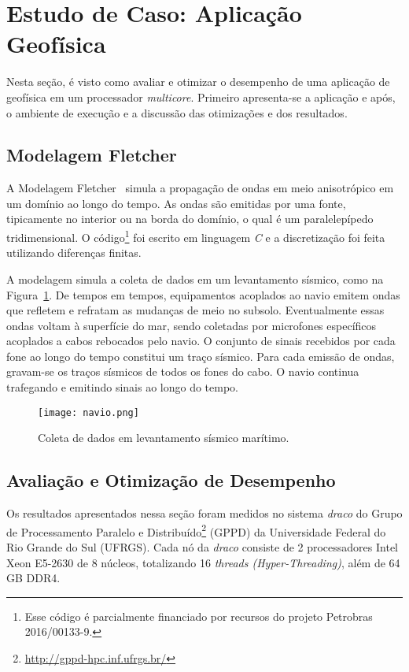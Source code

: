 \section{Estudo de Caso: Aplicação Geofísica}\label{sec:experiments}

Nesta seção, é visto como avaliar e otimizar o desempenho de uma aplicação de geofísica em um processador \textit{multicore}. Primeiro apresenta-se a aplicação e após, o ambiente de execução e a discussão das otimizações e dos resultados.

\subsection{Modelagem Fletcher}

A Modelagem Fletcher~\cite{fletcher2009reverse} simula a propagação de ondas em meio anisotrópico em um domínio ao longo do tempo. As ondas são emitidas por uma fonte, tipicamente no interior ou na borda do domínio, o qual é um paralelepípedo tridimensional. O código\footnote{Esse código é parcialmente financiado por recursos do projeto Petrobras 2016/00133-9.} foi escrito em linguagem \emph{C} e a discretização foi feita utilizando diferenças finitas.

A modelagem simula a coleta de dados em um levantamento sísmico, como na Figura~\ref{fig:sim}. De tempos em tempos, equipamentos acoplados ao navio emitem ondas que refletem e refratam as mudanças de meio no subsolo. Eventualmente essas ondas voltam à superfície do mar, sendo coletadas por microfones específicos acoplados a cabos rebocados pelo navio. O conjunto de sinais recebidos por cada fone ao longo do tempo constitui um traço sísmico. Para cada emissão de ondas, gravam-se os traços sísmicos de todos os fones do cabo. O navio continua trafegando e emitindo sinais ao longo do tempo.

\begin{figure}[!htb]
	\centerline{\texttt{[image: navio.png]}}
	\caption{Coleta de dados em levantamento sísmico marítimo.}
	\label{fig:sim}
\end{figure}

\subsection{Avaliação e Otimização de Desempenho}

Os resultados apresentados nessa seção foram medidos no sistema \emph{draco} do Grupo de Processamento Paralelo e Distribuído\footnote{\url{http://gppd-hpc.inf.ufrgs.br/}} (GPPD) da Universidade Federal do Rio Grande do Sul (UFRGS). Cada nó da \emph{draco} consiste de 2 processadores Intel Xeon E5-2630 de 8 núcleos, totalizando 16 \textit{threads (Hyper-Threading)}, além de 64 GB DDR4.

